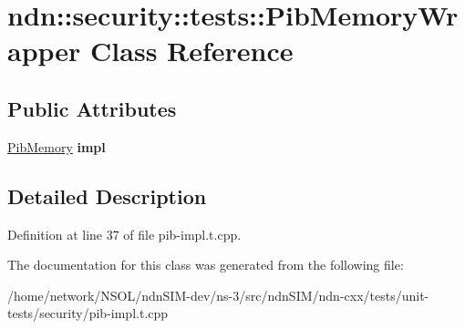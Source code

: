 \hypertarget{classndn_1_1security_1_1tests_1_1PibMemoryWrapper}{}\section{ndn\+:\+:security\+:\+:tests\+:\+:Pib\+Memory\+Wrapper Class Reference}
\label{classndn_1_1security_1_1tests_1_1PibMemoryWrapper}
\subsection*{Public Attributes}
\begin{DoxyCompactItemize}
\item 
\hyperlink{classndn_1_1security_1_1PibMemory}{Pib\+Memory} {\bfseries impl}\hypertarget{classndn_1_1security_1_1tests_1_1PibMemoryWrapper_af4dd4a8a2383bcebaef615ef0000e996}{}\label{classndn_1_1security_1_1tests_1_1PibMemoryWrapper_af4dd4a8a2383bcebaef615ef0000e996}

\end{DoxyCompactItemize}


\subsection{Detailed Description}


Definition at line 37 of file pib-\/impl.\+t.\+cpp.



The documentation for this class was generated from the following file\+:\begin{DoxyCompactItemize}
\item 
/home/network/\+N\+S\+O\+L/ndn\+S\+I\+M-\/dev/ns-\/3/src/ndn\+S\+I\+M/ndn-\/cxx/tests/unit-\/tests/security/pib-\/impl.\+t.\+cpp\end{DoxyCompactItemize}
